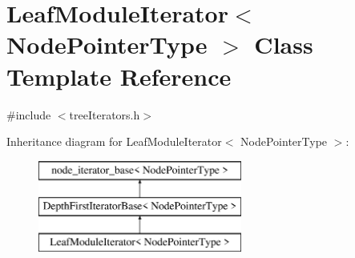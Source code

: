 \hypertarget{classLeafModuleIterator}{}\section{Leaf\+Module\+Iterator$<$ Node\+Pointer\+Type $>$ Class Template Reference}
\label{classLeafModuleIterator}


{\ttfamily \#include $<$tree\+Iterators.\+h$>$}

Inheritance diagram for Leaf\+Module\+Iterator$<$ Node\+Pointer\+Type $>$\+:\begin{figure}[H]
\begin{center}
\leavevmode
\includegraphics[height=3.000000cm]{classLeafModuleIterator}
\end{center}
\end{figure}
